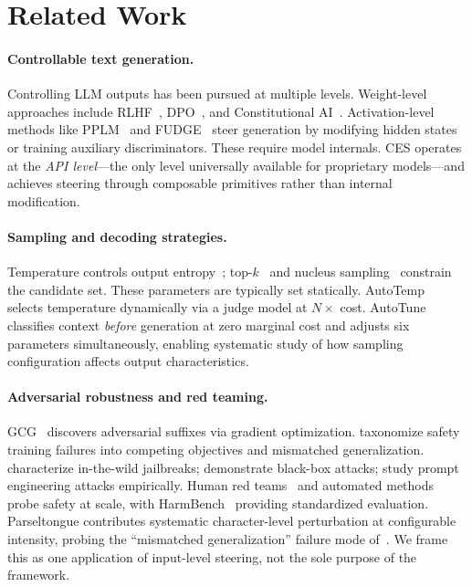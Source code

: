 \documentclass[11pt]{article}
\begin{document}
\section{Related Work}

\paragraph{Controllable text generation.}
Controlling LLM outputs has been pursued at multiple levels. Weight-level approaches include RLHF~\cite{ouyang2022training,stiennon2020learning}, DPO~\cite{rafailov2023direct}, and Constitutional AI~\cite{bai2022constitutional}. Activation-level methods like PPLM~\cite{dathathri2020plug} and FUDGE~\cite{yang2021fudge} steer generation by modifying hidden states or training auxiliary discriminators. These require model internals. CES operates at the \emph{API level}---the only level universally available for proprietary models---and achieves steering through composable primitives rather than internal modification.

\paragraph{Sampling and decoding strategies.}
Temperature controls output entropy~\cite{ackley1985learning}; top-$k$~\cite{fan2018hierarchical} and nucleus sampling~\cite{holtzman2020curious} constrain the candidate set. These parameters are typically set statically. AutoTemp~\cite{plinius2024autotemp} selects temperature dynamically via a judge model at $N\times$ cost. AutoTune classifies context \emph{before} generation at zero marginal cost and adjusts six parameters simultaneously, enabling systematic study of how sampling configuration affects output characteristics.

\paragraph{Adversarial robustness and red teaming.}
GCG~\cite{zou2023universal} discovers adversarial suffixes via gradient optimization. \citet{wei2023jailbroken} taxonomize safety training failures into competing objectives and mismatched generalization. \citet{shen2024anything} characterize in-the-wild jailbreaks; \citet{chao2023jailbreaking} demonstrate black-box attacks; \citet{liu2024jailbreaking} study prompt engineering attacks empirically. Human red teams~\cite{ganguli2022red} and automated methods~\cite{perez2022red} probe safety at scale, with HarmBench~\cite{mazeika2024harmbench} providing standardized evaluation. Parseltongue contributes systematic character-level perturbation at configurable intensity, probing the ``mismatched generalization'' failure mode of~\citet{wei2023jailbroken}. We frame this as one application of input-level steering, not the sole purpose of the framework.
\end{document}
